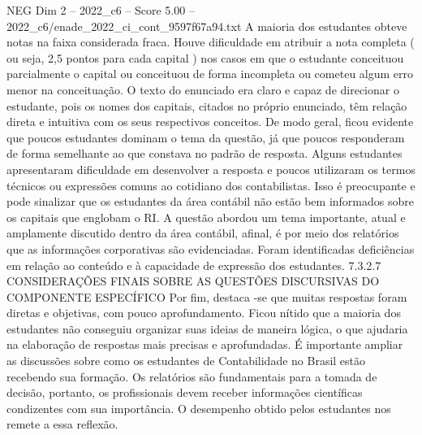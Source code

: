\begin{textsample}{NEG Dim 2 – 2022\_c6 – Score 5.00 – 2022\_c6/enade\_2022\_ci\_cont\_9597f67a94.txt}
A maioria dos estudantes obteve notas na faixa considerada fraca.
Houve dificuldade em atribuir a nota completa ( ou seja, 2,5 pontos para cada capital ) nos casos em que o estudante conceituou parcialmente o capital ou conceituou de forma incompleta ou cometeu algum erro menor na conceituação.
O texto do enunciado era claro e capaz de direcionar o estudante, pois os nomes dos capitais, citados no próprio enunciado, têm relação direta e intuitiva com os seus respectivos conceitos.
De modo geral, ficou evidente que poucos estudantes dominam o tema da questão, já que poucos responderam de forma semelhante ao que constava no padrão de resposta.
Alguns estudantes apresentaram dificuldade em desenvolver a resposta e poucos utilizaram os termos técnicos ou expressões comuns ao cotidiano dos contabilistas.
Isso é preocupante e pode sinalizar que os estudantes da área contábil não estão bem informados sobre os capitais que englobam o RI.
A questão abordou um tema importante, atual e amplamente discutido dentro da área contábil, afinal, é por meio dos relatórios que as informações corporativas são evidenciadas.
Foram identificadas deficiências em relação ao conteúdo e à capacidade de expressão dos estudantes. 7.3.2.7 CONSIDERAÇÕES FINAIS SOBRE AS QUESTÕES DISCURSIVAS DO COMPONENTE ESPECÍFICO Por fim, destaca -se que muitas respostas foram diretas e objetivas, com pouco aprofundamento.
Ficou nítido que a maioria dos estudantes não conseguiu organizar suas ideias de maneira lógica, o que ajudaria na elaboração de respostas mais precisas e aprofundadas.
É importante ampliar as discussões sobre como os estudantes de Contabilidade no Brasil estão recebendo sua formação.
Os relatórios são fundamentais para a tomada de decisão, portanto, os profissionais devem receber informações científicas condizentes com sua importância.
O desempenho obtido pelos estudantes nos remete a essa reflexão.

\end{textsample}
